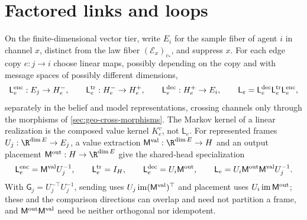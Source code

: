 \section{Factored links and loops}
\label{sec:selective-matrix-links}

On the finite-dimensional vector tier, write \(E_i\) for the sample fiber of
agent \(i\) in channel \(x\), distinct from the law fiber
\((\mathcal E_x)_{c_*}\), and suppress \(x\). For each edge copy \(e:j\to i\)
choose linear maps, possibly depending on the copy and with message spaces of
possibly different dimensions,
\begin{equation}
\mathsf L^{\rm enc}_e:E_j\to H_e^-,\qquad
\mathsf L^{\rm tr}_e:H_e^-\to H_e^+,\qquad
\mathsf L^{\rm dec}_e:H_e^+\to E_i,\qquad
\mathsf L_e=\mathsf L^{\rm dec}_e\mathsf L^{\rm tr}_e\mathsf L^{\rm enc}_e,
\label{eq:geo-selective-factorization}
\end{equation}
separately in the belief and model representations, crossing channels only
through the morphisms of \cref{sec:geo-cross-morphisms}. The Markov kernel of
a linear realization is the composed value kernel \(K^v_e\), not
\(\mathsf L_e\). For represented frames \(U_j:\R^{\dim E}\to E_j\), a value
extraction \(\mathsf M^{\rm val}:\R^{\dim E}\to H\) and an output placement
\(\mathsf M^{\rm out}:H\to\R^{\dim E}\) give the shared-head specialization
\begin{equation}
\mathsf L^{\rm enc}_e=\mathsf M^{\rm val}U_j^{-1},\qquad
\mathsf L^{\rm tr}_e=I_H,\qquad
\mathsf L^{\rm dec}_e=U_i\mathsf M^{\rm out},\qquad
\mathsf L_e=U_i\mathsf M^{\rm out}\mathsf M^{\rm val}U_j^{-1}.
\label{eq:geo-selective-attention-link}
\end{equation}
With \(\mathsf G_j=U_j^{-\top}U_j^{-1}\), sending uses
\(U_j\operatorname{im}(\mathsf M^{\rm val})^\top\) and placement uses
\(U_i\operatorname{im}\mathsf M^{\rm out}\); these and the comparison directions
can overlap and need not partition a frame, and
\(\mathsf M^{\rm out}\mathsf M^{\rm val}\) need be neither orthogonal nor
idempotent.

